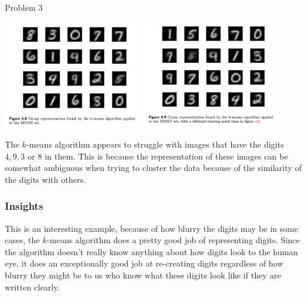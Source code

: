 \begin{problem}{Problem 3}
\begin{Highlight}[Solution]
        \begin{center}
            \includegraphics[width = 0.45\textwidth]{./Images/Figure 4.8.png}
            \hspace*{20pt}
            \includegraphics[width = 0.45\textwidth]{./Images/Figure 4.9.png}
        \end{center}
        The $k$-means algorithm appears to struggle with images that have the digits $4,9,3$ or $8$ in them. This is because the representation of these images can be somewhat ambiguous when trying to cluster
        the data because of the similarity of the digits with others. \vspace*{1em}

        \subsubsection*{Insights}

        This is an interesting example, because of how blurry the digits may be in some cases, the $k$-means algorithm does a pretty good job of representing digits. Since the algorithm doesn't really know
        anything about how digits look to the human eye, it does an exceptionally good job at re-creating digits regardless of how blurry they might be to us who know what these digits look like if they are
        written clearly.
    \end{Highlight}
\end{problem}

